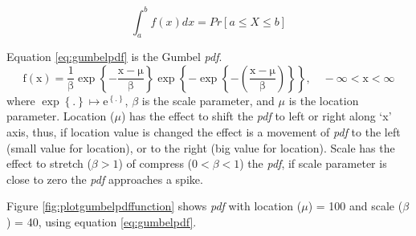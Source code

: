 \documentclass[12pt,oneside]{reedthesis}
\begin{document}
\[
\int_a^b f(x)dx = Pr[a \leq X \leq b]
\]

Equation \eqref{eq:gumbelpdf} is the Gumbel \emph{pdf}.
\begin{equation}
  \mathrm{
          f(x)=\frac{1}{\beta}
          \exp\left\{
            -\frac{x-\mu}{\beta}
          \right\}
          \exp\left\{
            -\exp\left\{
              -\left(
                \frac{x-\mu}{\beta}
              \right)
            \right\}
          \right\},
          \quad -\infty < x < \infty
         }
  \label{eq:gumbelpdf}
\end{equation}
where \(\exp\left\{.\right\} \mapsto \mathrm{e}^{\left\{.\right\}}\), \(\beta\) is the scale parameter, and \(\mu\) is the location parameter. Location (\(\mu\)) has the effect to shift the \emph{pdf} to left or right along `x' axis, thus, if location value is changed the effect is a movement of \emph{pdf} to the left (small value for location), or to the right (big value for location). Scale has the effect to stretch (\(\beta > 1\)) of compress (\(0 < \beta< 1\)) the \emph{pdf}, if scale parameter is close to zero the \emph{pdf} approaches a spike.

Figure \ref{fig:plotgumbelpdffunction} shows \emph{pdf} with location (\(\mu\)) = 100 and scale (\(\beta\)) = 40, using equation \eqref{eq:gumbelpdf}.
\end{document}
